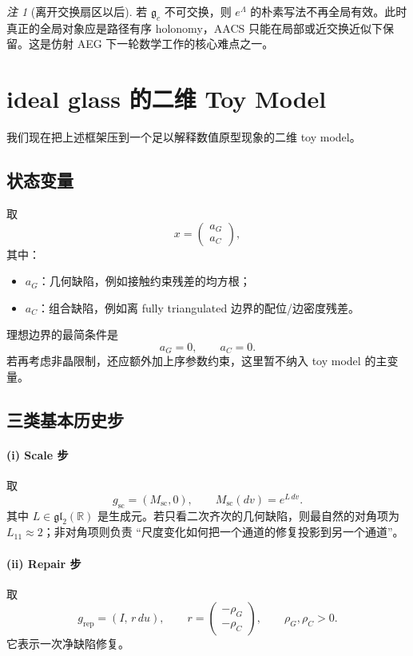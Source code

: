 \documentclass[11pt,a4paper]{ctexart}
\theoremstyle{remark}
\newtheorem{remark}[definition]{注}
\newcommand{\R}{\mathbb{R}}
\begin{document}
\begin{remark}[离开交换扇区以后]
若 $\mathfrak g_c$ 不可交换，则 $e^{\Lambda}$ 的朴素写法不再全局有效。此时真正的全局对象应是路径有序 holonomy，AACS 只能在局部或近交换近似下保留。这是仿射 AEG 下一轮数学工作的核心难点之一。
\end{remark}

\section{ideal glass 的二维 Toy Model}

我们现在把上述框架压到一个足以解释数值原型现象的二维 toy model。

\subsection{状态变量}
取
\[
x=
\begin{pmatrix}
a_G\\ a_C
\end{pmatrix},
\]
其中：
\begin{itemize}
    \item $a_G$：几何缺陷，例如接触约束残差的均方根；
    \item $a_C$：组合缺陷，例如离 fully triangulated 边界的配位/边密度残差。
\end{itemize}
理想边界的最简条件是
\[
a_G=0,\qquad a_C=0.
\]
若再考虑非晶限制，还应额外加上序参数约束，这里暂不纳入 toy model 的主变量。

\subsection{三类基本历史步}

\paragraph{(i) Scale 步} 取
\[
g_{\mathrm{sc}}=(M_{\mathrm{sc}},0),
\qquad
M_{\mathrm{sc}}(dv)=e^{L\,dv}.
\]
其中 $L\in\mathfrak{gl}_2(\R)$ 是生成元。若只看二次齐次的几何缺陷，则最自然的对角项为 $L_{11}\approx 2$；非对角项则负责 ``尺度变化如何把一个通道的修复投影到另一个通道''。

\paragraph{(ii) Repair 步} 取
\[
g_{\mathrm{rep}}=(I,\,r\,du),
\qquad
r=
\begin{pmatrix}
-\rho_G\\ -\rho_C
\end{pmatrix},
\qquad
\rho_G,\rho_C>0.
\]
它表示一次净缺陷修复。
\end{document}
